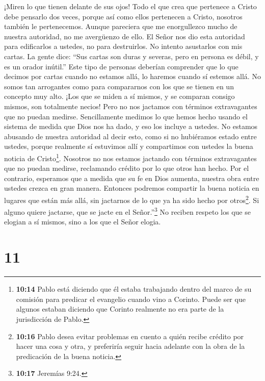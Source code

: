  ¡Miren lo que tienen delante de sus ojos! Todo el que crea
que pertenece a Cristo debe pensarlo dos veces, porque así como ellos
pertenecen a Cristo, nosotros también le pertenecemos. 
Aunque pareciera que me enorgullezco mucho de nuestra autoridad, no me
avergüenzo de ello. El Señor nos dio esta autoridad para edificarlos a
ustedes, no para destruirlos.  No intento asustarlos con mis
cartas.  La gente dice: ``Sus cartas son duras y severas,
pero en persona es débil, y es un orador inútil.''  Este
tipo de personas deberían comprender que lo que decimos por cartas
cuando no estamos allá, lo haremos cuando sí estemos allá. 
No somos tan arrogantes como para compararnos con los que se tienen en
un concepto muy alto. ¡Los que se miden a sí mismos, y se comparan
consigo mismos, son totalmente necios!  Pero no nos
jactamos con términos extravagantes que no puedan medirse. Sencillamente
medimos lo que hemos hecho usando el sistema de medida que Dios nos ha
dado, y eso los incluye a ustedes.  No estamos abusando de
nuestra autoridad al decir esto, como si no hubiéramos estado entre
ustedes, porque realmente sí estuvimos allí y compartimos con ustedes la
buena noticia de Cristo\footnote{\textbf{10:14} Pablo está diciendo que
  él estaba trabajando dentro del marco de su comisión para predicar el
  evangelio cuando vino a Corinto. Puede ser que algunos estaban
  diciendo que Corinto realmente no era parte de la jurisdicción de
  Pablo.}.  Nosotros no nos estamos jactando con términos
extravagantes que no puedan medirse, reclamando crédito por lo que otros
han hecho. Por el contrario, esperamos que a medida que su fe en Dios
aumenta, nuestra obra entre ustedes crezca en gran manera. 
Entonces podremos compartir la buena noticia en lugares que están más
allá, sin jactarnos de lo que ya ha sido hecho por otros\footnote{\textbf{10:16}
  Pablo desea evitar problemas en cuento a quién recibe crédito por
  hacer una cosa y otra, y preferiría seguir hacia adelante con la obra
  de la predicación de la buena noticia.}.  Si alguno
quiere jactarse, que se jacte en el Señor.''\footnote{\textbf{10:17}
  Jeremías 9:24.}  No reciben respeto los que se elogian a
sí mismos, sino a los que el Señor elogia.

\hypertarget{section-10}{%
\section{11}\label{section-10}}

